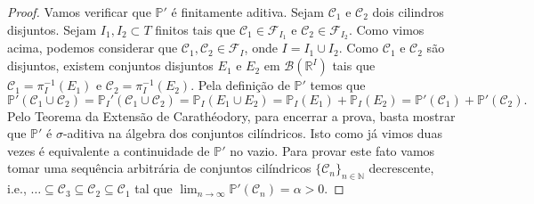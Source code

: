 \begin{proof}
Vamos verificar que $\mathbb{P}'$ é finitamente aditiva.
Sejam $\mathcal{C}_1$ e $\mathcal{C}_2$ dois cilindros 
disjuntos. Sejam $I_1,I_2\subset T$ finitos 
tais que $\mathcal{C}_1\in \mathcal{F}_{I_1}$ e 
$\mathcal{C}_2\in \mathcal{F}_{I_2}$. Como vimos 
acima, podemos considerar que $\mathcal{C}_1,\mathcal{C}_2\in \mathcal{F}_{I}$,
onde $I=I_1\cup I_2$. 
Como $\mathcal{C}_1$ e $\mathcal{C}_2$ são disjuntos, 
existem conjuntos disjuntos $E_1$ e $E_2$ em 
$\mathscr{B}(\mathbb{R}^I)$ 
tais que $\mathcal{C}_1 = \pi_{I}^{-1}(E_1)$ e 
$\mathcal{C}_2 = \pi_{I}^{-1}(E_2)$.
Pela definição de $\mathbb{P}'$ temos que 
\[
\mathbb{P}'(\mathcal{C}_1\cup \mathcal{C}_2)
=
\mathbb{P}_I'(\mathcal{C}_1\cup \mathcal{C}_2)
=
\mathbb{P}_I(E_1\cup E_2)
=
\mathbb{P}_I(E_1)+ \mathbb{P}_I(E_2)
=
\mathbb{P}'(\mathcal{C}_1) + \mathbb{P}'(\mathcal{C}_2).
\] 
Pelo Teorema da Extensão de Carathéodory, 
para encerrar a prova, basta mostrar que
$\mathbb{P}'$ é $\sigma$-aditiva na álgebra dos conjuntos
cilíndricos. Isto como já vimos duas vezes é equivalente 
a continuidade de $\mathbb{P}'$ no vazio. 
Para provar este fato vamos tomar uma sequência arbitrária
de conjuntos cilíndricos $\{\mathcal{C}_n\}_{n\in\mathbb{N}}$
decrescente, i.e.,
$\ldots \subseteq \mathcal{C}_3\subseteq \mathcal{C}_2\subseteq \mathcal{C}_1$
tal que $\lim_{n\to\infty} \mathbb{P}'(\mathcal{C}_n)=\alpha>0.$
\end{proof}